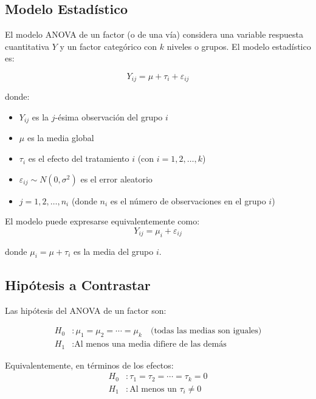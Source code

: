 \documentclass[11pt,a4paper]{article}
\theoremstyle{definition}
\begin{document}
\subsection{Modelo Estadístico}

El modelo ANOVA de un factor (o de una vía) considera una variable respuesta cuantitativa $Y$ y un factor categórico con $k$ niveles o grupos. El modelo estadístico es:

\begin{equation}
Y_{ij} = \mu + \tau_i + \varepsilon_{ij}
\end{equation}

donde:
\begin{itemize}
    \item $Y_{ij}$ es la $j$-ésima observación del grupo $i$
    \item $\mu$ es la media global
    \item $\tau_i$ es el efecto del tratamiento $i$ (con $i = 1, 2, \ldots, k$)
    \item $\varepsilon_{ij} \sim N(0, \sigma^2)$ es el error aleatorio
    \item $j = 1, 2, \ldots, n_i$ (donde $n_i$ es el número de observaciones en el grupo $i$)
\end{itemize}

El modelo puede expresarse equivalentemente como:
\begin{equation}
Y_{ij} = \mu_i + \varepsilon_{ij}
\end{equation}

donde $\mu_i = \mu + \tau_i$ es la media del grupo $i$.

\subsection{Hipótesis a Contrastar}

Las hipótesis del ANOVA de un factor son:

\begin{align*}
H_0 &: \mu_1 = \mu_2 = \cdots = \mu_k \quad \text{(todas las medias son iguales)} \\
H_1 &: \text{Al menos una media difiere de las demás}
\end{align*}

Equivalentemente, en términos de los efectos:
\begin{align*}
H_0 &: \tau_1 = \tau_2 = \cdots = \tau_k = 0 \\
H_1 &: \text{Al menos un } \tau_i \neq 0
\end{align*}
\end{document}
